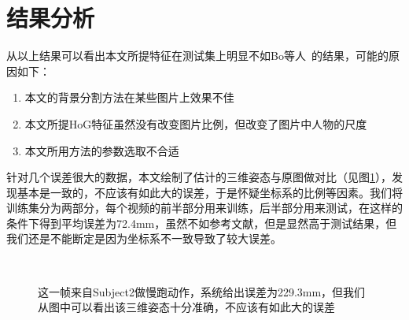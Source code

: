 \section{结果分析}
\label{sec:analysis}
从以上结果可以看出本文所提特征在测试集上明显不如Bo等人~\cite{bo2010twin}的结果，可能的原因如下：
\begin{enumerate}
  \item 本文的背景分割方法在某些图片上效果不佳
  \item 本文所提HoG特征虽然没有改变图片比例，但改变了图片中人物的尺度
  \item 本文所用方法的参数选取不合适
\end{enumerate}

针对几个误差很大的数据，本文绘制了估计的三维姿态与原图做对比（见图\ref{fig:bigerr1}），发现基本是一致的，不应该有如此大的误差，于是怀疑坐标系的比例等因素。我们将训练集分为两部分，每个视频的前半部分用来训练，后半部分用来测试，在这样的条件下得到平均误差为72.4mm，虽然不如参考文献，但是显然高于测试结果，但我们还是不能断定是因为坐标系不一致导致了较大误差。

\begin{figure}[htbp]
  \centering
  \hspace{.5cm}
  \hspace{.5cm}
  \\
  \hspace{.5cm}
  \hspace{.5cm}
  \caption[较大误差示意]{这一帧来自Subject2做慢跑动作，系统给出误差为229.3mm，但我们从图中可以看出该三维姿态十分准确，不应该有如此大的误差}\label{fig:bigerr1}
\end{figure} 